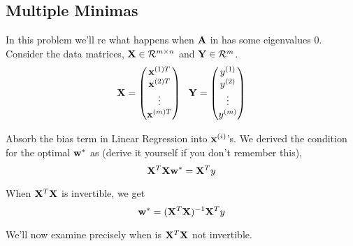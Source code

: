 \subsection{Multiple Minimas}\label{prob:dependent_factors}
In this problem we'll re what happens when $\mathbf{A}$ in  has some eigenvalues $0$. Consider the data matrices, $\mathbf{X} \in \mathcal{R}^{m \times n}$ and $\mathbf{Y} \in \mathcal{R}^{m}$.
\begin{equation*}
\mX =    
\begin{pmatrix}
\mathbf{x}^{(1)T}\\
\mathbf{x}^{(2)T}\\
\vdots \\
\mathbf{x}^{(m)T}\\
\end{pmatrix}
\ \ 
\mY=    
\begin{pmatrix}
y^{(1)}\\
y^{(2)}\\
\vdots \\
y^{(m)}\\
\end{pmatrix}
\end{equation*}

Absorb the bias term in Linear Regression into $\mathbf{x}^{(i)}$'s. We derived the condition for the optimal $\mathbf{w}^{*}$ as (derive it yourself if you don't remember this),
\begin{equation}\label{equation:minima_condition}
    \mathbf{X}^T\mathbf{X}\mathbf{w}^* = \mathbf{X}^Ty
\end{equation}

When $\mathbf{X}^T\mathbf{X}$ is invertible, we get
\begin{equation}
    \mathbf{w}^* = (\mathbf{X}^T\mathbf{X})^{-1}\mathbf{X}^Ty
\end{equation}

We'll now examine precisely when is $\mathbf{X}^T\mathbf{X}$ not invertible.

